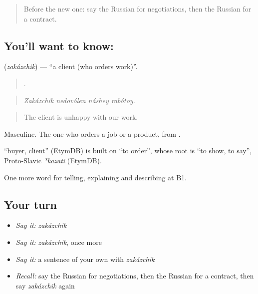 \label{lesson:RU-C363-zakazchik}



\begin{quote}
Before the new one: say the Russian for negotiations, then the Russian for a contract.
\end{quote}

\subsection*{You'll want to know: }
\textbf{} (\emph{zakázchik}) — \textquotedblleft{}a client (who orders work)\textquotedblright{}.

\begin{quote}
   .
\end{quote}

\begin{quote}
\emph{Zakázchik nedovólen náshey rabótoy.}
\end{quote}

\begin{quote}
The client is unhappy with our work.
\end{quote}

Masculine. The one who orders a job or a product, from \emph{}.

\begin{cousinweb}
\textbf{} \textquotedblleft{}buyer, client\textquotedblright{} (EtymDB) is built on \emph{} \textquotedblleft{}to order\textquotedblright{}, whose root is \emph{} \textquotedblleft{}to show, to say\textquotedblright{}, Proto-Slavic \emph{*kazati} (EtymDB).
\end{cousinweb}

\begin{grammarlens}[title={What you've built}]
One more word for telling, explaining and describing at B1.
\end{grammarlens}

\subsection*{Your turn}
\begin{itemize}
\raggedright
  \item \emph{Say it:} \emph{zakázchik}
  \item \emph{Say it:} \emph{zakázchik}, once more
  \item \emph{Say it:} a sentence of your own with \emph{zakázchik}
  \item \emph{Recall:} say the Russian for negotiations, then the Russian for a contract, then say \emph{zakázchik} again
\end{itemize}

